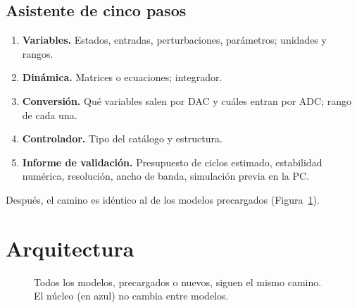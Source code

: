 \documentclass[12pt,letterpaper]{article}
\begin{document}
\subsection{Asistente de cinco pasos}

\begin{enumerate}
    \item \textbf{Variables.} Estados, entradas, perturbaciones, parámetros; unidades y rangos.
    \item \textbf{Dinámica.} Matrices o ecuaciones; integrador.
    \item \textbf{Conversión.} Qué variables salen por DAC y cuáles entran por ADC; rango de cada una.
    \item \textbf{Controlador.} Tipo del catálogo y estructura.
    \item \textbf{Informe de validación.} Presupuesto de ciclos estimado, estabilidad numérica, resolución, ancho de banda, simulación previa en la PC.
\end{enumerate}
Después, el camino es idéntico al de los modelos precargados (Figura~\ref{fig:estructura}).

\section{Arquitectura}
\label{sec:arq}

\begin{figure}[!htbp]
\centering
{}
\caption{Todos los modelos, precargados o nuevos, siguen el mismo camino. El núcleo (en azul) no cambia entre modelos.}
\label{fig:estructura}
\end{figure}
\end{document}
